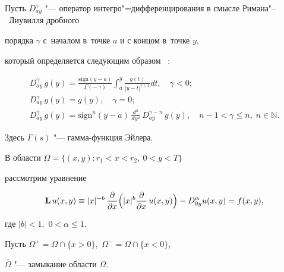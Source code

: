\makerutitle






Пусть $D_{ay}^{\gamma}$ "--- оператор интегро"=дифференцирования в смысле Римана"--~Лиувилля дробного

порядка $\gamma$ с~началом в~точке $a$ и с концом в~точке $y$,

который определяется следующим образом~\cite[c.~28]{add:1} \cite[с.~14]{Pskhu}:   

\begin{gather*}

D_{ay}^{\gamma}\,g(y)=\frac{\text{sign}(y-a)}{\Gamma(-\,\gamma)}

\int _{a}^{y}\frac{g(t)}{|y-t|^{\gamma+1}}dt, \quad  \gamma<0;

\\

D_{ay}^{\gamma}\,g(y)=g(y),  \quad  \gamma=0;

\\ 

D_{ay}^{\gamma}\,g(y)=\text{sign}^{n}(y-a)\,\frac{d^n}{dy^n}\,

D_{ay}^{\gamma-n}\,g(y),  \quad  n-1<\gamma\leqslant n,  \; n\in \mathbb{N}.

\end{gather*} 

Здесь $\Gamma(s)$ "--- гамма-функция Эйлера.





В области $\Omega=\{(x,y): r_{1}<x<r_{2},\ 0< y < T \}$ 

рассмотрим уравнение

\begin{equation} \label{MS1}

{\bf L}\,u(x,y) \equiv |x|^{-b}\,\frac{\partial}{\partial x}\Bigl(|x|^{b}\frac{\partial}{\partial x}\,u(x,y)\Bigr)-

D^{\alpha}_{0y}u(x,y)=f(x,y),

\end{equation}

где $|b|<1,$ $0<\alpha\leqslant 1.$ 



Пусть $\Omega^{+}=\Omega\cap\{x>0 \},$ $\Omega^{-}=\Omega\cap\{x<0\},$ 

$\bar{\Omega}$ "--- замыкание области $\Omega.$ 





